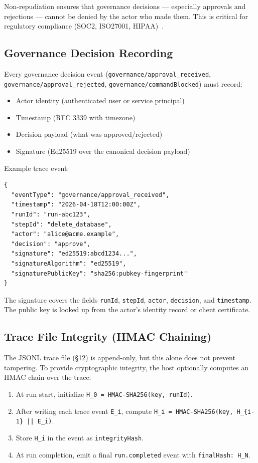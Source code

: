 Non-repudiation ensures that governance decisions — especially approvals and
rejections — cannot be denied by the actor who made them.  This is critical for
regulatory compliance (SOC2, ISO27001, HIPAA)~\cite{soc2-aicpa,iso27001,hipaa-security-rule}.

\subsection{Governance Decision Recording}

Every governance decision event (\texttt{governance/approval\_received},
\texttt{governance/approval\_rejected}, \texttt{governance/commandBlocked})
must record:

\begin{itemize}
  \item Actor identity (authenticated user or service principal)
  \item Timestamp (RFC 3339 with timezone)~\cite{rfc3339}
  \item Decision payload (what was approved/rejected)
  \item Signature (Ed25519 over the canonical decision payload)
\end{itemize}

Example trace event:

\begin{verbatim}
{
  "eventType": "governance/approval_received",
  "timestamp": "2026-04-18T12:00:00Z",
  "runId": "run-abc123",
  "stepId": "delete_database",
  "actor": "alice@acme.example",
  "decision": "approve",
  "signature": "ed25519:abcd1234...",
  "signatureAlgorithm": "ed25519",
  "signaturePublicKey": "sha256:pubkey-fingerprint"
}
\end{verbatim}

The signature covers the fields \texttt{runId}, \texttt{stepId},
\texttt{actor}, \texttt{decision}, and \texttt{timestamp}.  The public key is
looked up from the actor's identity record or client certificate.

\subsection{Trace File Integrity (HMAC Chaining)}

The JSONL trace file (§12) is append-only, but this alone does not prevent
tampering.  To provide cryptographic integrity, the host optionally computes an
HMAC chain over the trace:

\begin{enumerate}
  \item At run start, initialize \texttt{H\_0 = HMAC-SHA256(key, runId)}.
  \item After writing each trace event \texttt{E\_i}, compute
        \texttt{H\_i = HMAC-SHA256(key, H\_\{i-1\} || E\_i)}.
  \item Store \texttt{H\_i} in the event as \texttt{integrityHash}.
  \item At run completion, emit a final \texttt{run.completed} event with
        \texttt{finalHash: H\_N}.
\end{enumerate}

